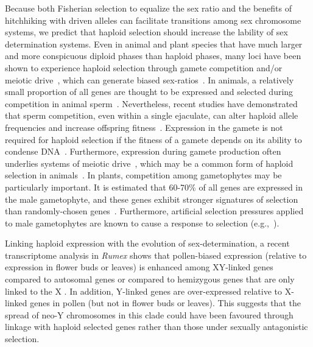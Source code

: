 \documentclass[10pt,letterpaper]{article}
\begin{document}
Because both Fisherian selection to equalize the sex ratio and the benefits of hitchhiking with driven alleles can facilitate transitions among sex chromosome systems, we predict that haploid selection should increase the lability of sex determination systems.
Even in animal and plant species that have much larger and more conspicuous diploid phases than haploid phases, many loci have been shown to experience haploid selection through gamete competition and/or meiotic drive~\cite{Mulcahy:1996ha,JOSEPH:2004haa, Lalanne2004,Ubeda:2005gw,Fishman2005,Leppala2008,Leppala2013,Didion2015,Didion2016,Lindholm:2016cw}, which can generate biased sex-ratios~\cite{Jaenike:2001vb,Burt:2006,Lloyd:1974tz,Conn:1981uw,Stehlik:2005ul,Stehlik:2006to,Field:2012fd,Field:2013cc}. 
In animals, a relatively small proportion of all genes are thought to be expressed and selected during competition in animal sperm~\cite{Zheng:2001fi,JOSEPH:2004haa,Vibranovski:2010et}.
Nevertheless, recent studies have demonstrated that sperm competition, even within a single ejaculate, can alter haploid allele frequencies and increase offspring fitness~\cite{Immler:2014im,Alavioon2017}.
Expression in the gamete is not required for haploid selection if the fitness of a gamete depends on its ability to condense DNA~\cite{Immler2018}. 
Furthermore, expression during gamete production often underlies systems of meiotic drive~\cite{Tau2007,Cocquet2012,Helleu2016}, which may be a common form of haploid selection in animals~\cite{Bachtrog2018}.
In plants, competition among gametophytes may be particularly important. 
It is estimated that 60-70\% of all genes are expressed in the male gametophyte, and these genes exhibit stronger signatures of selection than randomly-chosen genes~\cite{Borg:2009jpa,Arunkumar:2013iq,Gossmann:2014dua}. 
Furthermore, artificial selection pressures applied to male gametophytes are known to cause a response to selection (e.g.,~\cite{Hormaza:1996cv,Ravikumar:2003uo,Hedhly:2004iv,Clarke:2004ir}). 

Linking haploid expression with the evolution of sex-determination, a recent transcriptome analysis in \textit{Rumex} shows that pollen-biased expression (relative to expression in flower buds or leaves) is enhanced among XY-linked genes compared to autosomal genes or compared to hemizygous genes that are only linked to the X 
\cite{Sandler264382}. 
In addition, Y-linked genes are over-expressed relative to X-linked genes in pollen (but not in flower buds or leaves). 
This suggests that the spread of neo-Y chromosomes in this clade could have been favoured through linkage with haploid selected genes rather than those under sexually antagonistic selection. 
\end{document}
